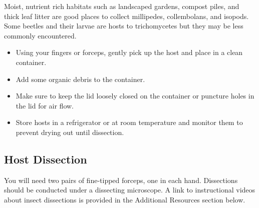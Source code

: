 \documentclass[]{book}
\providecommand{\tightlist}{%
  \setlength{\itemsep}{0pt}\setlength{\parskip}{0pt}}
\begin{document}
Moist, nutrient rich habitats such as landscaped gardens, compost piles, and thick leaf litter are good places to collect millipedes, collembolans, and isopods. Some beetles and their larvae are hosts to trichomycetes but they may be less commonly encountered.

\begin{itemize}
\tightlist
\item
  Using your fingers or forceps, gently pick up the host and place in a clean container.
\item
  Add some organic debris to the container.
\item
  Make sure to keep the lid loosely closed on the container or puncture holes in the lid for air flow.
\item
  Store hosts in a refrigerator or at room temperature and monitor them to prevent drying out until dissection.
\end{itemize}

\hypertarget{host-dissection}{%
\subsection{\texorpdfstring{\textbf{{Host Dissection}}}{Host Dissection}}\label{host-dissection}}

You will need two pairs of fine-tipped forceps, one in each hand. Dissections should be conducted under a dissecting microscope. A link to instructional videos about insect dissections is provided in the Additional Resources section below.
\end{document}
